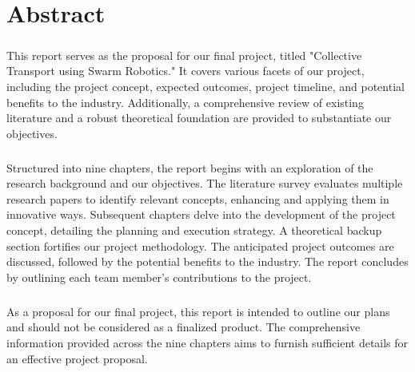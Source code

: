 \chapter*{Abstract}

\paragraph*{}
This report serves as the proposal for our final project, titled "Collective Transport using Swarm Robotics." It covers various facets of our project, including the project concept, expected outcomes, project timeline, and potential benefits to the industry. Additionally, a comprehensive review of existing literature and a robust theoretical foundation are provided to substantiate our objectives.

\paragraph*{}
Structured into nine chapters, the report begins with an exploration of the research background and our objectives. The literature survey evaluates multiple research papers to identify relevant concepts, enhancing and applying them in innovative ways. Subsequent chapters delve into the development of the project concept, detailing the planning and execution strategy. A theoretical backup section fortifies our project methodology. The anticipated project outcomes are discussed, followed by the potential benefits to the industry. The report concludes by outlining each team member's contributions to the project.

\paragraph*{}
As a proposal for our final project, this report is intended to outline our plans and should not be considered as a finalized product. The comprehensive information provided across the nine chapters aims to furnish sufficient details for an effective project proposal.
